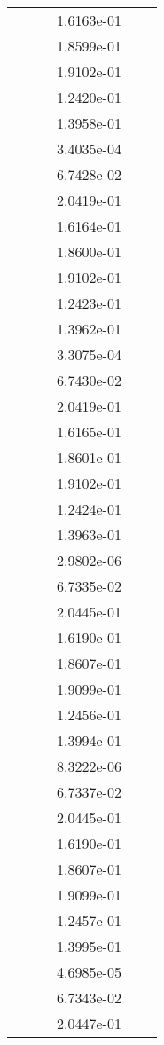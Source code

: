 \begin{xltabular}{\textwidth}{r|rS[table-format=1.3e+2]S[table-format=1.4e+2]S[table-format=1.4e+2]S[table-format=-1.5]}
&  &  & 1.6163e-01 & & \\
&  &  & 1.8599e-01 & & \\
&  &  & 1.9102e-01 & & \\
&  &  & 1.2420e-01 & & \\
&  &  & 1.3958e-01 & & \\
&  &  & 3.4035e-04 & & \\
&  &  & 6.7428e-02 & & \\
&  &  & 2.0419e-01 & & \\
&  &  & 1.6164e-01 & & \\
&  &  & 1.8600e-01 & & \\
&  &  & 1.9102e-01 & & \\
&  &  & 1.2423e-01 & & \\
&  &  & 1.3962e-01 & & \\
&  &  & 3.3075e-04 & & \\
&  &  & 6.7430e-02 & & \\
&  &  & 2.0419e-01 & & \\
&  &  & 1.6165e-01 & & \\
&  &  & 1.8601e-01 & & \\
&  &  & 1.9102e-01 & & \\
&  &  & 1.2424e-01 & & \\
&  &  & 1.3963e-01 & & \\
&  &  & 2.9802e-06 & & \\
&  &  & 6.7335e-02 & & \\
&  &  & 2.0445e-01 & & \\
&  &  & 1.6190e-01 & & \\
&  &  & 1.8607e-01 & & \\
&  &  & 1.9099e-01 & & \\
&  &  & 1.2456e-01 & & \\
&  &  & 1.3994e-01 & & \\
&  &  & 8.3222e-06 & & \\
&  &  & 6.7337e-02 & & \\
&  &  & 2.0445e-01 & & \\
&  &  & 1.6190e-01 & & \\
&  &  & 1.8607e-01 & & \\
&  &  & 1.9099e-01 & & \\
&  &  & 1.2457e-01 & & \\
&  &  & 1.3995e-01 & & \\
&  &  & 4.6985e-05 & & \\
&  &  & 6.7343e-02 & & \\
&  &  & 2.0447e-01 & & \\

\end{xltabular}
